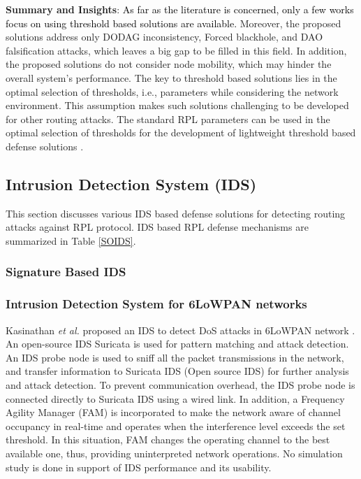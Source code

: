 \documentclass[10pt,journal,sort & compress]{IEEEtran}
\begin{document}
\textbf{Summary and Insights}: \textcolor{black}{As far as the literature is concerned, only a few works \cite{Sehgal2014, Mayzaud2015, AddressingDAO} focus on using threshold based solutions are available.} Moreover, the proposed solutions address only DODAG inconsistency, Forced blackhole, and DAO falsification attacks, which leaves a big gap to be filled in this field. In addition, the proposed solutions do not consider node mobility, which may hinder the overall system's performance. The key to threshold based solutions lies in the optimal selection of thresholds, i.e., parameters while considering the network environment. This assumption makes such solutions challenging to be developed for other routing attacks. The standard RPL parameters can be used in the optimal selection of thresholds for the development of lightweight threshold based defense solutions \cite{TENCON2019,vermaETT}.

\subsection{Intrusion Detection System (IDS)}
This section discusses various IDS based defense solutions for detecting routing attacks against RPL protocol. IDS based RPL defense mechanisms are summarized in Table \ref{SOIDS}.

\subsubsection{Signature Based IDS}


\subsubsection*{Intrusion Detection System for 6LoWPAN networks}
Kasinathan \textit{et al.} \cite{kasinathan2013ids} proposed an IDS to detect DoS attacks in $ 6 $LoWPAN network . An open-source IDS Suricata is used for pattern matching and attack detection. An IDS probe node is used to sniff all the packet transmissions in the network, and transfer information to Suricata IDS (Open source IDS) for further analysis and attack detection. To prevent communication overhead, the IDS probe node is connected directly to Suricata IDS using a wired link. In addition, a Frequency Agility Manager (FAM) is incorporated to make the network aware of channel occupancy in real-time and operates when the interference level exceeds the set threshold. In this situation, FAM changes the operating channel to the best available one, thus, providing uninterpreted network operations. No simulation study is done in support of IDS performance and its usability.  
\end{document}
